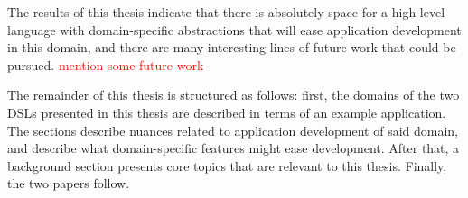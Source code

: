 The results of this thesis indicate that there is absolutely space for a high-level language with domain-specific abstractions
that will ease application development in this domain, and there are many interesting lines of future work that could be pursued.
\textcolor{red}{mention some future work}

The remainder of this thesis is structured as follows: first, the domains of the two DSLs presented in this thesis are
described in terms of an example application. The sections describe nuances related to application development of said domain,
and describe what domain-specific features might ease development. After that, a background section presents core topics that
are relevant to this thesis. Finally, the two papers follow.



